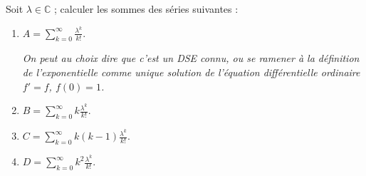 
\medskip

\begin{mdframed}
\begin{exercice}
Soit $\lambda \in \mathbb{C}$ ; calculer les sommes des séries suivantes :

\begin{enumerate}
\item $A = \sum_{k=0}^\infty \frac{\lambda^k}{k!}$. 

\textit{On peut au choix dire que c'est un DSE connu, ou se ramener à la définition de l'exponentielle comme unique solution de l'équation différentielle ordinaire $f' = f$, $f(0) = 1$.}
\item $B = \sum_{k=0}^\infty k \frac{\lambda^k}{k!}$.
\item $C = \sum_{k=0}^\infty k(k - 1) \frac{\lambda^k}{k!}$.
\item $D = \sum_{k=0}^\infty k^2 \frac{\lambda^k}{k!}$.
\end{enumerate}
\end{exercice}
\end{mdframed}

